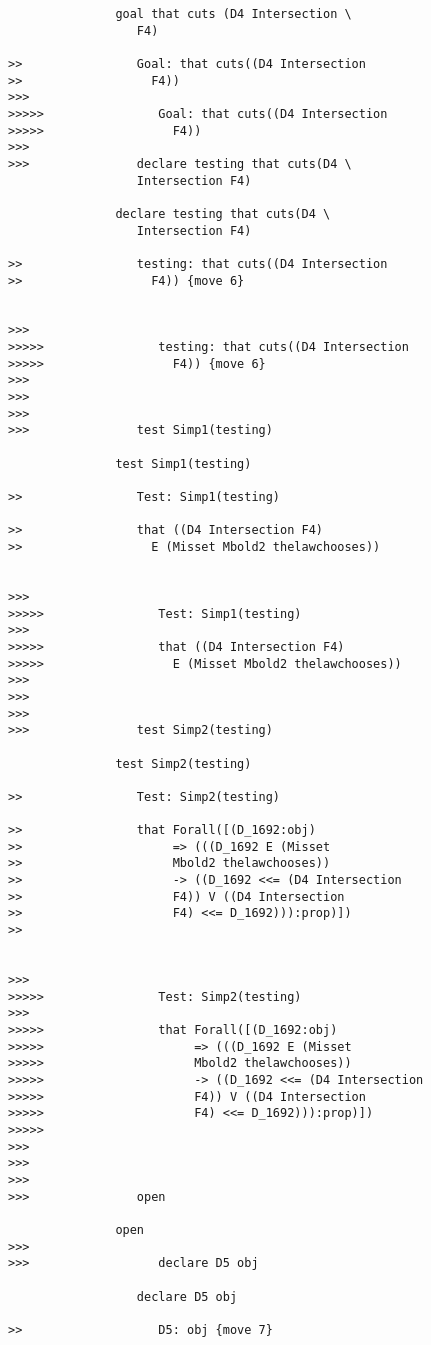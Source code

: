 \documentclass[12pt]{article}
\begin{document}
\begin{verbatim}
               goal that cuts (D4 Intersection \
                  F4)

>>                Goal: that cuts((D4 Intersection
>>                  F4))
>>>
>>>>>                Goal: that cuts((D4 Intersection
>>>>>                  F4))
>>>
>>>               declare testing that cuts(D4 \
                  Intersection F4)

               declare testing that cuts(D4 \
                  Intersection F4)

>>                testing: that cuts((D4 Intersection
>>                  F4)) {move 6}


>>>
>>>>>                testing: that cuts((D4 Intersection
>>>>>                  F4)) {move 6}
>>>
>>>
>>>
>>>               test Simp1(testing)

               test Simp1(testing)

>>                Test: Simp1(testing)

>>                that ((D4 Intersection F4)
>>                  E (Misset Mbold2 thelawchooses))


>>>
>>>>>                Test: Simp1(testing)
>>>
>>>>>                that ((D4 Intersection F4)
>>>>>                  E (Misset Mbold2 thelawchooses))
>>>
>>>
>>>
>>>               test Simp2(testing)

               test Simp2(testing)

>>                Test: Simp2(testing)

>>                that Forall([(D_1692:obj)
>>                     => (((D_1692 E (Misset
>>                     Mbold2 thelawchooses))
>>                     -> ((D_1692 <<= (D4 Intersection
>>                     F4)) V ((D4 Intersection
>>                     F4) <<= D_1692))):prop)])
>>                  


>>>
>>>>>                Test: Simp2(testing)
>>>
>>>>>                that Forall([(D_1692:obj)
>>>>>                     => (((D_1692 E (Misset
>>>>>                     Mbold2 thelawchooses))
>>>>>                     -> ((D_1692 <<= (D4 Intersection
>>>>>                     F4)) V ((D4 Intersection
>>>>>                     F4) <<= D_1692))):prop)])
>>>>>                  
>>>
>>>
>>>
>>>               open

               open
>>>
>>>                  declare D5 obj

                  declare D5 obj

>>                   D5: obj {move 7}



\end{verbatim}
\end{document}
